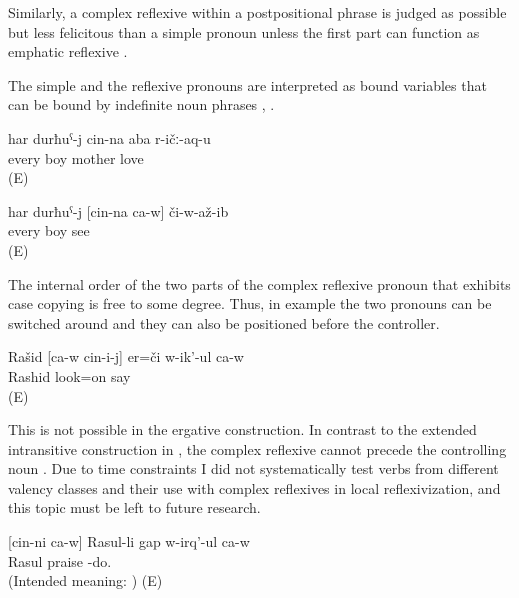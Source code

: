Similarly, a complex reflexive within a postpositional phrase is judged as possible but less felicitous than a simple pronoun unless the first part can function as emphatic reflexive .

The simple and the reflexive pronouns are interpreted as bound variables that can be bound by indefinite noun phrases , .
%
\begin{exe}
	\ex	\label{ex:Every boy loves his mother}
	\gll	har	durħuˁ-j	cin-na	aba	r-ičː-aq-u\\
		every	boy		mother	love\\
	\glt	{} (E)

	\ex	\label{ex:Every boy saw himself@25}
	\gll	har	durħuˁ-j	[cin-na	ca-w]	či-w-až-ib\\
		every	boy			see\\
	\glt	{} (E)
\end{exe}
%

The internal order of the two parts of the complex reflexive pronoun that exhibits case copying is free to some degree. Thus, in example  the two pronouns can be switched around and they can also be positioned before the controller.
%
\begin{exe}
	\ex	\label{ex:Rashid is looking at himself}
	\begin{xlist}
		\ex	\label{ex:Rashid is looking at himself@A}
		\gll	Rašid	[ca-w	cin-i-j]	er=či	w-ik'-ul	ca-w\\
			Rashid			look=on	say	\\
		\glt	{} (E)

		\ex	{}	\label{ex:Rashid is looking at himself@B}

		\ex	{}	\label{ex:Rashid is looking at himself@C}
	\end{xlist}
\end{exe}

This is not possible in the ergative construction. In contrast to the extended intransitive construction in , the complex reflexive cannot precede the controlling noun . Due to time constraints I did not systematically test verbs from different valency classes and their use with complex reflexives in local reflexivization, and this topic must be left to future research. 
%
\begin{exe} 
	\ex	\label{ex:himself Rashid is praising ungrammatical@29a}
	\gll {*} [cin-ni ca-w] Rasul-li gap w-irq'-ul ca-w	\\
	{}	 	Rasul		praise -do.	\\
	\glt	(Intended meaning: ) (E)
\end{exe}

